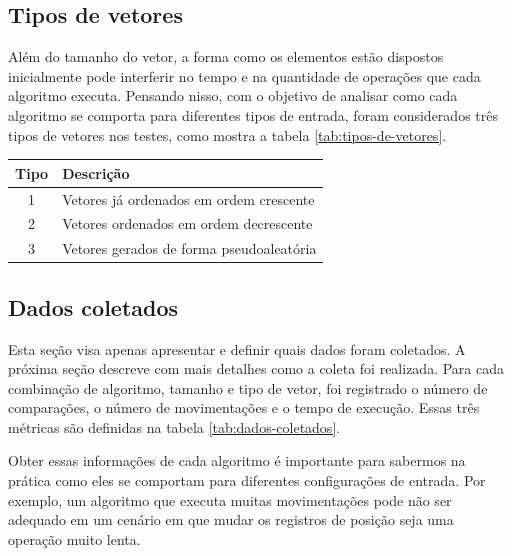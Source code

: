 \subsection{Tipos de vetores}
Além do tamanho do vetor, a forma como os elementos estão dispostos inicialmente pode interferir no tempo e na quantidade de operações que cada algoritmo executa. Pensando nisso, com o objetivo de analisar como cada algoritmo se comporta para diferentes tipos de entrada, foram considerados três tipos de vetores nos testes, como mostra a tabela \ref{tab:tipos-de-vetores}.

\begin{table}[H]
    \centering
    \begin{tabular}{ | c | l | }
        \hline
        Tipo   & Descrição\\
        \hline
        1      & Vetores já ordenados em ordem crescente\\
        2      & Vetores ordenados em ordem decrescente\\
        3      & Vetores gerados de forma pseudoaleatória\\
        \hline
    \end{tabular}
\end{table}

\subsection{Dados coletados}
Esta seção visa apenas apresentar e definir quais dados foram coletados. A próxima seção descreve com mais detalhes como a coleta foi realizada. Para cada combinação de algoritmo, tamanho e tipo de vetor, foi registrado o número de comparações, o número de movimentações e o tempo de execução. Essas três métricas são definidas na tabela \ref{tab:dados-coletados}.

Obter essas informações de cada algoritmo é importante para sabermos na prática como eles se comportam para diferentes configurações de entrada. Por exemplo, um algoritmo que executa muitas movimentações pode não ser adequado em um cenário em que mudar os registros de posição seja uma operação muito lenta.

